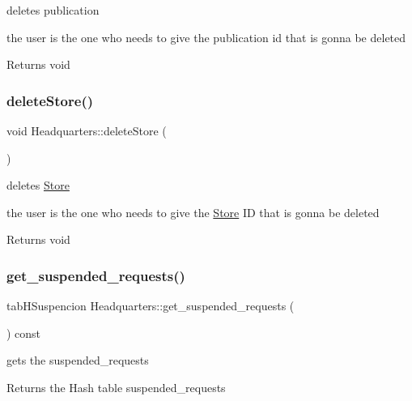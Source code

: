 deletes publication 

the user is the one who needs to give the publication id that is gonna be deleted

\begin{DoxyReturn}{Returns}
void 
\end{DoxyReturn}
\mbox{\label{class_headquarters_a39ceab5aab4576d7d082dd6e3c3cb2b5}} 
\subsubsection{\texorpdfstring{delete\+Store()}{deleteStore()}}
{\footnotesize\ttfamily void Headquarters\+::delete\+Store (\begin{DoxyParamCaption}{ }\end{DoxyParamCaption})}



deletes \hyperlink{class_store}{Store} 

the user is the one who needs to give the \hyperlink{class_store}{Store} ID that is gonna be deleted

\begin{DoxyReturn}{Returns}
void 
\end{DoxyReturn}
\mbox{\label{class_headquarters_a4ef55855baa94581a9987c47498a49e7}} 
\subsubsection{\texorpdfstring{get\+\_\+suspended\+\_\+requests()}{get\_suspended\_requests()}}
{\footnotesize\ttfamily tab\+H\+Suspencion Headquarters\+::get\+\_\+suspended\+\_\+requests (\begin{DoxyParamCaption}{ }\end{DoxyParamCaption}) const}



gets the suspended\+\_\+requests 

\begin{DoxyReturn}{Returns}
the Hash table suspended\+\_\+requests 
\end{DoxyReturn}
\mbox{\label{class_headquarters_a0d5357a865f5ccdf194404b97f04816a}} 
